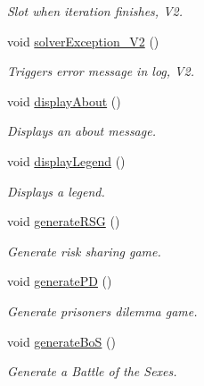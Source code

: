\begin{DoxyCompactItemize}
\begin{DoxyCompactList}\small\item\em Slot when iteration finishes, V2. \end{DoxyCompactList}\item 
void \hyperlink{classSGMainWindow_a4be88c15c38bbdc162ad410b99e79c0d}{solver\+Exception\+\_\+\+V2} ()
\begin{DoxyCompactList}\small\item\em Triggers error message in log, V2. \end{DoxyCompactList}\item 
\mbox{\label{classSGMainWindow_a7a5038dbd555a4717ac758dfcba51a33}} 
void \hyperlink{classSGMainWindow_a7a5038dbd555a4717ac758dfcba51a33}{display\+About} ()
\begin{DoxyCompactList}\small\item\em Displays an about message. \end{DoxyCompactList}\item 
\mbox{\label{classSGMainWindow_acb8c57315148c628af407ae8da6d5bb1}} 
void \hyperlink{classSGMainWindow_acb8c57315148c628af407ae8da6d5bb1}{display\+Legend} ()
\begin{DoxyCompactList}\small\item\em Displays a legend. \end{DoxyCompactList}\item 
\mbox{\label{classSGMainWindow_a1f0a10bf104be430f992d33b2de6e564}} 
void \hyperlink{classSGMainWindow_a1f0a10bf104be430f992d33b2de6e564}{generate\+R\+SG} ()
\begin{DoxyCompactList}\small\item\em Generate risk sharing game. \end{DoxyCompactList}\item 
\mbox{\label{classSGMainWindow_ac5fc1ea12ae702771432bb4b5840e792}} 
void \hyperlink{classSGMainWindow_ac5fc1ea12ae702771432bb4b5840e792}{generate\+PD} ()
\begin{DoxyCompactList}\small\item\em Generate prisoner\textquotesingle{}s dilemma game. \end{DoxyCompactList}\item 
\mbox{\label{classSGMainWindow_a2b7cf2dd928b163c78df0d863fa05347}} 
void \hyperlink{classSGMainWindow_a2b7cf2dd928b163c78df0d863fa05347}{generate\+BoS} ()
\begin{DoxyCompactList}\small\item\em Generate a Battle of the Sexes. \end{DoxyCompactList}\end{DoxyCompactItemize}
